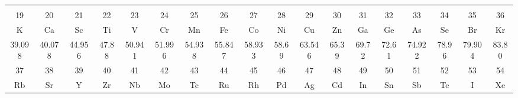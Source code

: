 \begin{tcolorbox}[
        colback=colorrds!5!white,
        colframe=colorrds!35!white,
        coltitle=black,
        fonttitle=\bfseries,
        center title,
        title=Tabla Periódica de los Elementos]
\begin{center}
\begin{tabular}{|c|c|p{17.8mm}*{9}{p{8.98mm}}|c|c|c|c|c|c|}
            \hline
        \end{tabular}
        \vspace{-3mm}
        \begin{tabular}{|c*{16}{|c}|c|}
                           &                &                &               &                &               &                &               &                &               &                &               &                &                &                &               &                &                                   \\[-6.8mm]
            \small 19      & \small 20      & \small 21      & \small 22     & \small 23      & \small 24     & \small 25      & \small 26     & \small 27      & \small 28     & \small 29      & \small 30     & \small 31      & \small 32      & \small 33      & \small 34     & \small 35      & \small 36                         \\
            K              & Ca             & Sc             & Ti            & V              & Cr            & Mn             & Fe            & Co             & Ni            & Cu             & Zn            & Ga             & Ge             & As             & Se            & Br             & Kr                                \\[-2mm]
            \small 39.098  & \small 40.078  & \small 44.956  & \small 47.88  & \small 50.941  & \small 51.996 & \small 54.938  & \small 55.847 & \small 58.933  & \small 58.69  & \small 63.546  & \small 65.39  & \small 69.72   & \small 72.61   & \small 74.922  & \small 78.96  & \small 79.904  & \small 83.80                      \\[-1mm]
            \hline
            \small 37      & \small 38      & \small 39      & \small 40     & \small 41      & \small 42     & \small 43      & \small 44     & \small 45      & \small 46     & \small 47      & \small 48     & \small 49      & \small 50      & \small 51      & \small 52     & \small 53      & \small 54                         \\[-1mm]
            Rb             & Sr             & Y              & Zr            & Nb             & Mo            & Tc             & Ru            & Rh             & Pd            & Ag             & Cd            & In             & Sn             & Sb             & Te            & I              & Xe                                \\[-2mm]

\end{tabular}
\end{center}
\end{tcolorbox}
